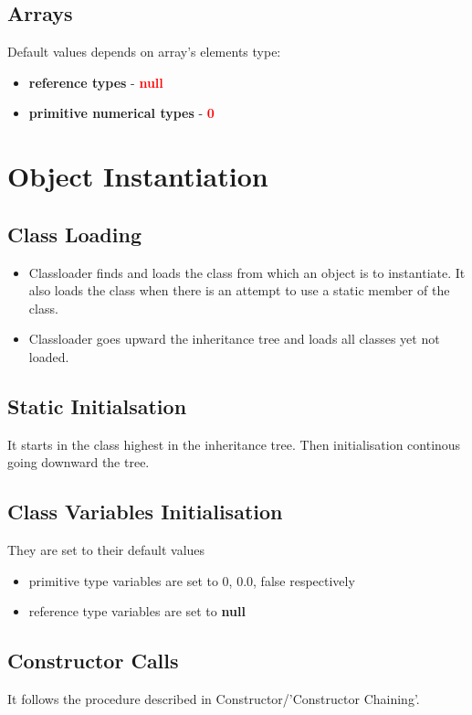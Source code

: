 \documentclass{report}
\begin{document}
\subsection{Arrays}
Default values depends on array's elements type:
\begin{itemize}
	\item \textbf{reference types} - \textbf{\textcolor{red}{null}}
	\item \textbf{primitive numerical types} - \textbf{\textcolor{red}{0}}
\end{itemize}

\section{Object Instantiation}

\subsection{Class Loading}
\begin{itemize}
	\item Classloader finds and loads the class from which an object is to instantiate. It also loads the class when there is an attempt to use a static member of the class.
	\item Classloader goes upward the inheritance tree and loads all classes yet not loaded.
\end{itemize}

\subsection{Static Initialsation}
It starts in the class highest in the inheritance tree. Then initialisation continous going downward the tree.

\subsection{Class Variables Initialisation}
They are set to their default values
\begin{itemize}
	\item primitive type variables are set to 0, 0.0, false respectively
	\item reference type variables are set to \textbf{null}
\end{itemize}

\subsection{Constructor Calls}
It follows the procedure described in Constructor/'Constructor Chaining'.
\end{document}
